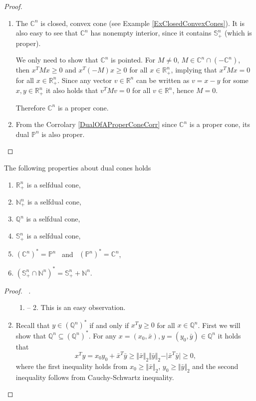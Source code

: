 \documentclass[12pt]{book}
\theoremstyle{definition}
\begin{document}
\begin{appendix}
\begin{proof}
\begin{enumerate}
\item The $\mathbb{C}^n$ is closed, convex cone (see Example \ref{ExClosedConvexCones}). It is also easy to see that $\mathbb{C}^n$ has nonempty interior, since it contains $\mathbb{S}^n_+$ (which is proper).

We only need to show that $\mathbb{C}^n$ is pointed. For $M\neq 0$, $M\in\mathbb{C}^n\cap (-\mathbb{C}^n)$, 
then $x^TMx\geq 0$ and $x^T(-M)x\geq 0$ for all $x\in\mathbb{R}^n_+$, implying that 
$x^TMx=0$ for all $x\in\mathbb{R}^n_+$. Since any vector $v\in \mathbb{R}^n$ can be written as $v = x - y$ for some $x,y\in\mathbb{R}^n_+$ it also holds that $v^TMv=0$ for all $v\in\mathbb{R}^n$, hence $M=0$.

Therefore $\mathbb{C}^n$ is a proper cone. 

\item From the Corrolary \ref{DualOfAProperConeCorr} since $\mathbb{C}^n$ is a proper cone, its dual $\mathbb{P}^n$ is also proper.
\end{enumerate}
\end{proof}

 The following properties about dual cones holds
\label{ExDualCones}
\begin{enumerate}
\item $\mathbb{R}^n_+$ is a selfdual cone,
\item $\mathbb{N}^n_+$ is a selfdual cone,
\item $\mathbb{Q}^n$ is a selfdual cone,
\item $\mathbb{S}^n_+$ is a selfdual cone,
\item $(\mathbb{C}^n)^* = \mathbb{P}^{n}$ \ and \ $(\mathbb{P}^n)^* = \mathbb{C}^{n}$, 
\item $(\mathbb{S}^n_+\cap \mathbb{N}^n)^* = \mathbb{S}^n_+ + \mathbb{N}^n$.
\end{enumerate}

\begin{proof}[Proof. \ ]
\begin{enumerate}
\item[\ 1. -- 2.] This is an easy observation.
\setcounter{enumi}{2}
\item Recall that $y\in(\mathbb{Q}^n)^*$ if and only if $x^Ty \geq 0$ for all $x\in\mathbb{Q}^n$. First we will show that $\mathbb{Q}^n \subseteq (\mathbb{Q}^n)^*$. For any $x = (x_0,\bar{x}),y=(y_0,\bar{y})\in \mathbb{Q}^n $ it holds that
$$ x^Ty = x_0y_0 + \bar{x}^T\bar{y} \geq \Vert \bar{x}\Vert_2 \Vert \bar{y}\Vert_2 - \vert \bar{x}^T\bar{y}\vert \geq 0,$$ where the first inequality holds from $x_0\geq \Vert \bar{x}\Vert_2$,  $y_0\geq \Vert \bar{y}\Vert_2$ and the second inequality follows from Cauchy-Schwartz inequality.


\end{enumerate}
\end{proof}
\end{appendix}
\end{document}

